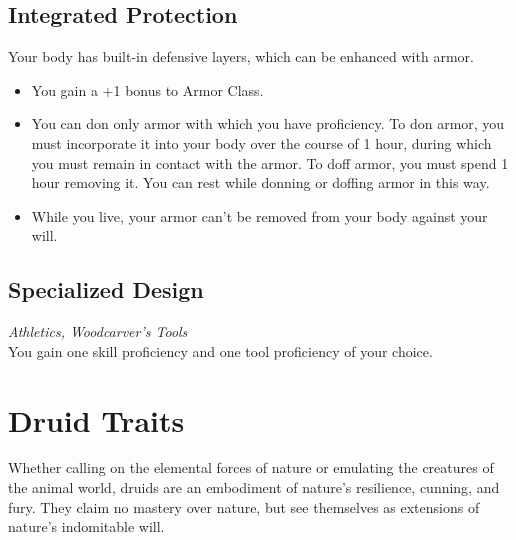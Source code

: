 \documentclass[letterpaper,openany,oneside,twocolumn]{book}
\begin{document}
\subsection*{Integrated Protection}
Your body has built-in defensive layers, which can be enhanced with armor.
\begin{itemize}
	\item You gain a +1 bonus to Armor Class.
	\item You can don only armor with which you have proficiency. To don armor, you must incorporate it into your body over the course of 1 hour, during which you must remain in contact with the armor. To doff armor, you must spend 1 hour removing it. You can rest while donning or doffing armor in this way.
	\item While you live, your armor can't be removed from your body against your will.
\end{itemize}
\subsection*{Specialized Design}
\textit{Athletics, Woodcarver's Tools}\\
You gain one skill proficiency and one tool proficiency of your choice.

\section*{Druid Traits}
Whether calling on the elemental forces of nature or emulating the creatures of the animal world, druids are an embodiment of nature's resilience, cunning, and fury. They claim no mastery over nature, but see themselves as extensions of nature's indomitable will.
\end{document}
